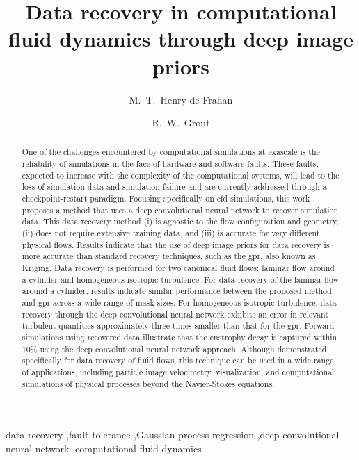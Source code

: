 \documentclass[review]{elsarticle}
\begin{document}
\begin{frontmatter}

\title{Data recovery in computational fluid dynamics through deep image priors}

\author[main]{M.~T.~Henry de Frahan}

\author[main]{R.~W.~Grout}


\address[main]{High Performance Algorithms and Complex Fluids, Computational Science Center, National Renewable Energy Laboratory, 15013 Denver W Pkwy, ESIF301, Golden, CO 80401, USA}

\begin{abstract}

  One of the challenges encountered by computational simulations at
  exascale is the reliability of simulations in the face of hardware
  and software faults. These faults, expected to increase with the
  complexity of the computational systems, will lead to the loss of
  simulation data and simulation failure and are currently addressed
  through a checkpoint-restart paradigm. Focusing specifically on
  \gls{cfd} simulations, this work proposes a method that uses a deep
  convolutional neural network to recover simulation data. This data
  recovery method (i) is agnostic to the flow configuration and
  geometry, (ii) does not require extensive training data, and (iii) is
  accurate for very different physical flows. Results indicate that
  the use of deep image priors for data recovery is more accurate than
  standard recovery techniques, such as the \gls{gpr}, also known as
  Kriging. Data recovery is performed for two canonical fluid flows:
  laminar flow around a cylinder and homogeneous isotropic
  turbulence. For data recovery of the laminar flow around a cylinder,
  results indicate similar performance between the proposed method and
  \gls{gpr} across a wide range of mask sizes. For homogeneous
  isotropic turbulence, data recovery through the deep convolutional
  neural network exhibits an error in relevant turbulent quantities
  approximately three times smaller than that for the
  \gls{gpr}. Forward simulations using recovered data illustrate that
  the enstrophy decay is captured within $10\%$ using the deep
  convolutional neural network approach. Although demonstrated
  specifically for data recovery of fluid flows, this technique can be
  used in a wide range of applications, including particle image
  velocimetry, visualization, and computational simulations of
  physical processes beyond the Navier-Stokes equations.

\end{abstract}

\begin{keyword}
data recovery \sep fault tolerance \sep Gaussian process regression \sep deep convolutional neural network \sep computational fluid dynamics
\end{keyword}

\end{frontmatter}
\end{document}

